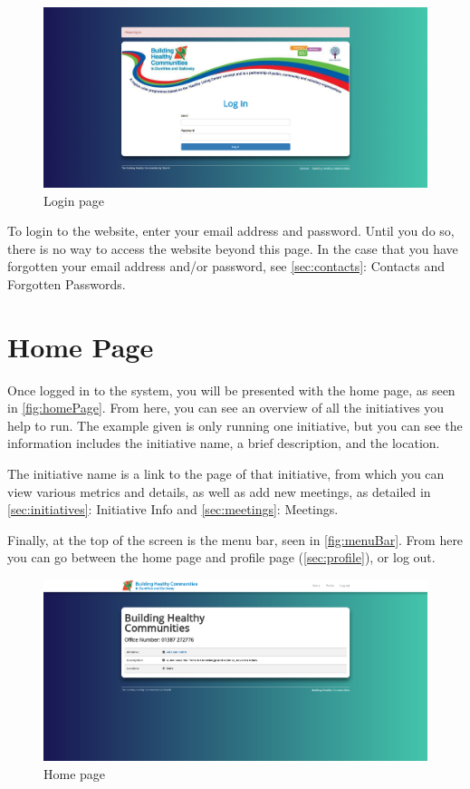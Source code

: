 \documentclass{bhcguides}
\begin{document}
\begin{figure}[h!]
 \centerline{\includegraphics[width=\textwidth, height=\textheight, keepaspectratio]{loginscreen.png}}
 \caption{Login page}
 \label{fig:initialLogin}
\end{figure}

To login to the website, enter your email address and password. Until you do so, there is no way to access the website beyond this page. In the case that you have forgotten your email address and/or password, see \autoref{sec:contacts}: Contacts and Forgotten Passwords.

\pagebreak

\section{Home Page}
\label{sec:homepage}

Once logged in to the system, you will be presented with the home page, as seen in \autoref{fig:homePage}. From here, you can see an overview of all the initiatives you help to run. The example given is only running one initiative, but you can see the information includes the initiative name, a brief description, and the location.

The initiative name is a link to the page of that initiative, from which you can view various metrics and details, as well as add new meetings, as detailed in \autoref{sec:initiatives}: Initiative Info and \autoref{sec:meetings}: Meetings.

Finally, at the top of the screen is the menu bar, seen in \autoref{fig:menuBar}. From here you can go between the home page and profile page (\autoref{sec:profile}), or log out.

\begin{figure}[h]
 \centerline{\includegraphics[width=\textwidth, height=\textheight, keepaspectratio]{homepage.png}}
 \caption{Home page}
 \label{fig:homePage}
\end{figure}
\end{document}
